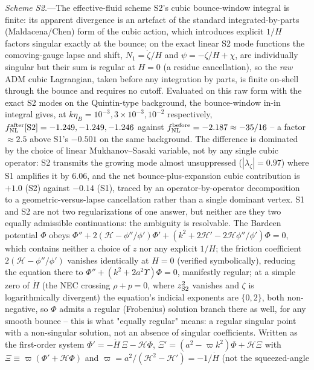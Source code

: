 \documentclass[aps,prd,twocolumn,superscriptaddress,nofootinbib,longbibliography]{revtex4-2}
\newcommand{\fnl}{f_{\rm NL}}
\begin{document}
\textit{Scheme S2.}---The effective-fluid scheme S2's cubic
bounce-window integral is finite: its apparent divergence is an artefact
of the standard
integrated-by-parts (Maldacena/Chen) form of the cubic action, which
introduces explicit $1/H$ factors singular exactly at the bounce; on the
exact linear S2 mode functions the comoving-gauge lapse and shift,
$N_1=\dot\zeta/H$ and $\psi=-\zeta/H+\chi$, are individually singular but
their sum is regular at $H=0$ (a residue cancellation), so the \emph{raw}
ADM cubic Lagrangian, taken before any integration by parts, is finite
on-shell through the bounce and requires no cutoff. Evaluated on this raw
form with the exact S2 modes on the Quintin-type background, the
bounce-window in-in integral gives, at $k\eta_B=10^{-3},3\times10^{-3},
10^{-2}$ respectively, $\fnl^{\rm after}[{\rm S2}]=-1.249,-1.249,-1.246$
against $\fnl^{\rm before}=-2.187\approx-35/16$ -- a factor $\approx2.5$
above S1's $-0.501$ on the same background. The difference is dominated by
the choice of linear Mukhanov--Sasaki variable, not by any single cubic
operator: S2 transmits the growing mode almost unsuppressed
($|\lambda_\zeta|=0.97$) where S1 amplifies it by $6.06$, and the net
bounce-plus-expansion cubic contribution is $+1.0$ (S2) against $-0.14$
(S1), traced by an operator-by-operator decomposition to a
geometric-versus-lapse cancellation rather than a single dominant vertex.
S1 and S2 are not two regularizations of one answer, but neither are they
two equally admissible continuations: the ambiguity is resolvable. The
Bardeen potential $\Phi$ obeys
$\Phi''+2(\mathcal H-\phi''/\phi')\Phi'+(k^2+2\mathcal H'-2\mathcal
H\phi''/\phi')\Phi=0$, which contains neither a choice of $z$ nor any
explicit $1/H$; the friction coefficient $2(\mathcal H-\phi''/\phi')$
vanishes identically at $H=0$ (verified symbolically), reducing the
equation there to
$\Phi''+(k^2+2a^2\Upsilon)\Phi=0$, manifestly regular; at a simple zero
of $\dot H$ (the NEC crossing $\rho+p=0$, where $z^2_{\rm S2}$ vanishes
and $\zeta$ is logarithmically divergent) the equation's indicial
exponents are $\{0,2\}$, both non-negative, so $\Phi$ admits a regular
(Frobenius) solution branch there as well, for any smooth bounce -- this
is what "equally regular" means: a regular singular point with a
non-singular solution, not an absence of singular coefficients. Written
as the first-order system
$\Phi'=-\dot H\,\Xi-\mathcal H\Phi$, $\Xi'=(a^2-\varpi k^2)\Phi+\mathcal
H\Xi$ with $\Xi\equiv\varpi(\Phi'+\mathcal H\Phi)$ and
$\varpi=a^2/(\mathcal H^2-\mathcal H')=-1/\dot H$ (not the squeezed-angle
\end{document}

